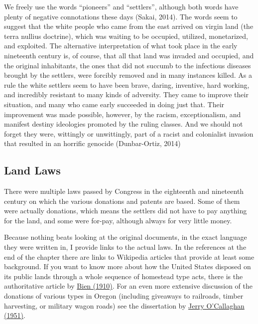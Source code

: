 \documentclass[
  12pt,
]{book}
\begin{document}
We freely use the words ``pioneers'' and ``settlers'', although both words have plenty of negative connotations these days (Sakai, 2014). The words seem to suggest that the white people who came from the east arrived on virgin land (the terra nullius doctrine), which was waiting to be occupied, utilized, monetarized, and exploited. The alternative interpretation of what took place in the early nineteenth century is, of course, that all that land was invaded and occupied, and the original inhabitants, the ones that did not succumb to the infectious diseases brought by the settlers, were forcibly removed and in many instances killed. As a rule the white settlers seem to have been brave, daring, inventive, hard working, and incredibly resistant to many kinds of adversity. They came to improve their situation, and many who came early succeeded in doing just that. Their improvement was made possible, however, by the racism, exceptionalism, and manifest destiny ideologies promoted by the ruling classes. And we should not forget they were, wittingly or unwittingly, part of a racist and colonialist invasion that resulted in an horrific genocide (Dunbar-Ortiz, 2014)

\hypertarget{land-laws}{%
\subsection{Land Laws}\label{land-laws}}

There were multiple laws passed by Congress in the eighteenth and nineteenth century on which the various donations and patents are based. Some of them were actually donations, which means the settlers did not have to pay anything for the land, and some were for-pay, although always for very little money.

Because nothing beats looking at the original documents, in the exact language they were written in, I provide links to the actual laws. In the references at the end of the chapter there are links to Wikipedia articles that provide at least some background. If you want to know more about how the United States disposed on its public lands through a whole sequence of homestead type acts, there is the authoritative article by \href{https://drive.google.com/file/d/1TT_lgoh_nI8LSdztGw_claFQYfHje16G}{Bien (1910)}. For an even more extensive discussion of the donations of various types in Oregon (including giveaways to railroads, timber harvesting, or military wagon roads) see the dissertation by \href{https://drive.google.com/file/d/1T8HRj39qobQ_4NkydJpagwnRQvFPAEUB}{Jerry O'Callaghan (1951)}.
\end{document}
